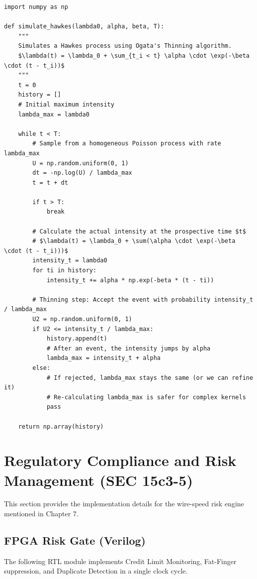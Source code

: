 \begin{lstlisting}[style=pythonstyle, caption={Simulation of a Hawkes process via Ogata's Thinning Algorithm}, label={lst:ogata}]
import numpy as np

def simulate_hawkes(lambda0, alpha, beta, T):
    """
    Simulates a Hawkes process using Ogata's Thinning algorithm.
    $\lambda(t) = \lambda_0 + \sum_{t_i < t} \alpha \cdot \exp(-\beta \cdot (t - t_i))$
    """
    t = 0
    history = []
    # Initial maximum intensity
    lambda_max = lambda0

    while t < T:
        # Sample from a homogeneous Poisson process with rate lambda_max
        U = np.random.uniform(0, 1)
        dt = -np.log(U) / lambda_max
        t = t + dt
        
        if t > T:
            break

        # Calculate the actual intensity at the prospective time $t$
        # $\lambda(t) = \lambda_0 + \sum(\alpha \cdot \exp(-\beta \cdot (t - t_i)))$
        intensity_t = lambda0
        for ti in history:
            intensity_t += alpha * np.exp(-beta * (t - ti))

        # Thinning step: Accept the event with probability intensity_t / lambda_max
        U2 = np.random.uniform(0, 1)
        if U2 <= intensity_t / lambda_max:
            history.append(t)
            # After an event, the intensity jumps by alpha
            lambda_max = intensity_t + alpha
        else:
            # If rejected, lambda_max stays the same (or we can refine it)
            # Re-calculating lambda_max is safer for complex kernels
            pass

    return np.array(history)
\end{lstlisting}

\section{Regulatory Compliance and Risk Management (SEC 15c3-5)}
This section provides the implementation details for the wire-speed risk engine mentioned in Chapter 7.

\subsection{FPGA Risk Gate (Verilog)}
The following RTL module implements Credit Limit Monitoring, Fat-Finger suppression, and Duplicate Detection in a single clock cycle.

